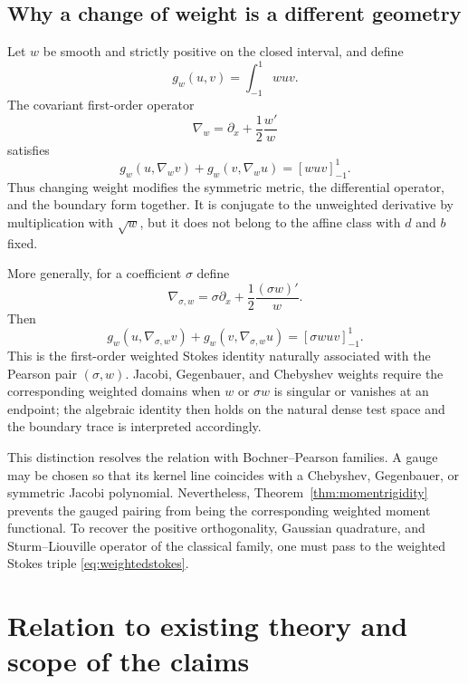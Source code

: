 \documentclass[11pt,a4paper]{article}
\theoremstyle{definition}
\theoremstyle{remark}
\newcommand{\bracket}[1]{\left[#1\right]_{-1}^{1}}
\begin{document}
\subsection{Why a change of weight is a different geometry}

Let $w$ be smooth and strictly positive on the closed interval, and define
\[
 g_w(u,v)=\int_{-1}^{1}wuv.
\]
The covariant first-order operator
\begin{equation}\label{eq:weightedderivative}
 \nabla_w=\partial_x+\frac12\frac{w'}w
\end{equation}
satisfies
\begin{equation}\label{eq:weightedstokes}
 g_w(u,\nabla_wv)+g_w(v,\nabla_wu)=\bracket{wuv}.
\end{equation}
Thus changing weight modifies the symmetric metric, the differential operator, and the
boundary form together.  It is conjugate to the unweighted derivative by multiplication with
$\sqrt w$, but it does not belong to the affine class with $d$ and $b$ fixed.

More generally, for a coefficient $\sigma$ define
\[
 \nabla_{\sigma,w}
 =\sigma\partial_x+\frac12\frac{(\sigma w)'}{w}.
\]
Then
\begin{equation}\label{eq:pearsonstokes}
 g_w(u,\nabla_{\sigma,w}v)+g_w(v,\nabla_{\sigma,w}u)
 =\bracket{\sigma wuv}.
\end{equation}
This is the first-order weighted Stokes identity naturally associated with the Pearson pair
$(\sigma,w)$.  Jacobi, Gegenbauer, and Chebyshev weights require the corresponding weighted
domains when $w$ or $\sigma w$ is singular or vanishes at an endpoint; the algebraic identity
then holds on the natural dense test space and the boundary trace is interpreted accordingly.

This distinction resolves the relation with Bochner--Pearson families.  A gauge may be
chosen so that its kernel line coincides with a Chebyshev, Gegenbauer, or symmetric Jacobi
polynomial.  Nevertheless, Theorem~\ref{thm:momentrigidity} prevents the gauged pairing from
being the corresponding weighted moment functional.  To recover the positive orthogonality,
Gaussian quadrature, and Sturm--Liouville operator of the classical family, one must pass to
the weighted Stokes triple \eqref{eq:weightedstokes}.

\section{Relation to existing theory and scope of the claims}
\end{document}
